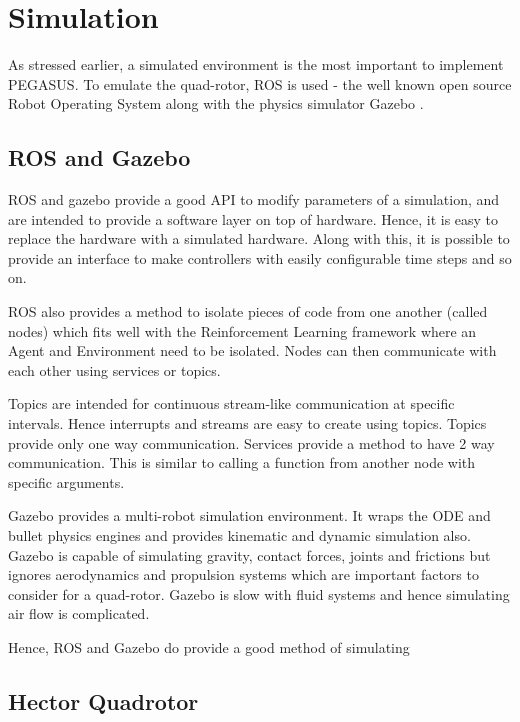 \documentclass[hidelinks,BTech]{iitmdiss}
\begin{document}

\chapter{Simulation}

As stressed earlier, a simulated environment is the most important to implement PEGASUS. To emulate the quad-rotor, ROS \cite{ROS} is used - the well known open source Robot Operating System along with the physics simulator Gazebo \cite{Gazebo}.

\section{ROS and Gazebo}

ROS and gazebo provide a good API to modify parameters of a simulation, and are intended to provide a software layer on top of hardware. Hence, it is easy to replace the hardware with a simulated hardware. Along with this, it is possible to provide an interface to make controllers with easily configurable time steps and so on.

ROS also provides a method to isolate pieces of code from one another (called nodes) which fits well with the Reinforcement Learning framework where an Agent and Environment need to be isolated. Nodes can then communicate with each other using services or topics.

Topics are intended for continuous stream-like communication at specific intervals. Hence interrupts and streams are easy to create using topics. Topics provide only one way communication. Services provide a method to have 2 way communication. This is similar to calling a function from another node with specific arguments.

Gazebo provides a multi-robot simulation environment. It wraps the ODE and bullet physics engines and provides kinematic and dynamic simulation also. Gazebo is capable of simulating gravity, contact forces, joints and frictions but ignores aerodynamics and propulsion systems which are important factors to consider for a quad-rotor. Gazebo is slow with fluid systems and hence simulating air flow is complicated.

Hence, ROS and Gazebo do provide a good method of simulating

\section{Hector Quadrotor}
\end{document}
